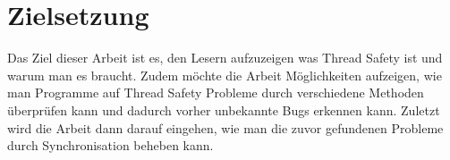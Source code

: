 \section{Zielsetzung}

Das Ziel dieser Arbeit ist es, den Lesern aufzuzeigen was Thread Safety ist und warum man es braucht. Zudem möchte die Arbeit Möglichkeiten aufzeigen, wie man Programme auf Thread Safety Probleme durch verschiedene Methoden überprüfen kann und dadurch vorher unbekannte Bugs erkennen kann. Zuletzt wird die Arbeit dann darauf eingehen, wie man die zuvor gefundenen Probleme durch Synchronisation beheben kann.